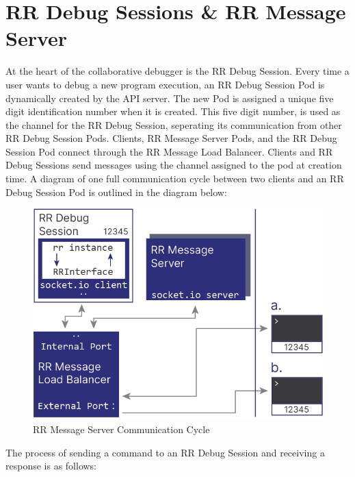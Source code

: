 \documentclass[12pt]{article}
\begin{document}
\section{RR Debug Sessions \& RR Message Server}

At the heart of the collaborative debugger is the RR Debug Session.
Every time a user wants to debug a new program execution, an RR Debug
Session Pod is dynamically created by the API server.  The new Pod is
assigned a unique five digit identification number when it is created.
This five digit number, is used as the channel for the RR Debug
Session, seperating its communication from other RR Debug Session
Pods.  Clients, RR Message Server Pods, and the RR Debug Session Pod
connect through the RR Message Load Balancer.  Clients and RR Debug
Sessions send messages using the channel assigned to the pod at
creation time.  A diagram of one full communication cycle between two
clients and an RR Debug Session Pod is outlined in the diagram below:

\begin{figure}[h!]

  \includegraphics[scale=1]{rr_detailed}
  \centering
  \caption{RR Message Server Communication Cycle}
  \label{rr:detailed}
\end{figure}

The process of sending a command to an RR Debug Session and receiving
a response is as follows:
\end{document}
